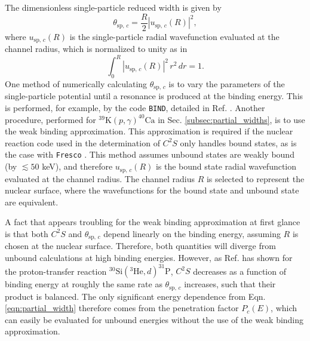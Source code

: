 The dimensionless single-particle reduced width is given by
\begin{equation} \label{eqn:single_particle_red_width}
\theta_{\mathrm{sp}, \, c} = \frac{R}{2} | u_{\mathrm{sp}, \, c}(R) |^{2},
\end{equation}
where $u_{\mathrm{sp}, \, c}(R)$ is the single-particle radial wavefunction evaluated at the channel radius, which is normalized to unity as in
\begin{equation}
\int_{0}^{R} |u_{\mathrm{sp}, \, c}(R)|^{2} \, r^{2} \, dr = 1.
\end{equation}
One method of numerically calculating $\theta_{\mathrm{sp}, \, c}$ is to vary the parameters of the single-particle potential until a resonance is produced at the binding energy. This is performed, for example, by the code \texttt{BIND}, detailed in Ref. \cite{Iliadis1997}. Another procedure, performed for $^{39}\mathrm{K}(p, \gamma)^{40}\mathrm{Ca}$ in Sec. \ref{subsec:partial_widths}, is to use the weak binding approximation. This approximation is required if the nuclear reaction code used in the determination of $C^{2}S$ only handles bound states, as is the case with \texttt{Fresco} \cite{Thompson1988,Fresco}. This method assumes unbound states are weakly bound (by $\lesssim 50$ keV), and therefore $u_{\mathrm{sp}, \, c}(R)$ is the bound state radial wavefunction evaluated at the channel radius. The channel radius $R$ is selected to represent the nuclear surface, where the wavefunctions for the bound state and unbound state are equivalent.

A fact that appears troubling for the weak binding approximation at first glance is that both $C^{2}S$ and $\theta_{\mathrm{sp}, \, c}$ depend linearly on the binding energy, assuming $R$ is chosen at the nuclear surface. Therefore, both quantities will diverge from unbound calculations at high binding energies. However, as Ref. \cite{Harrouz2023} has shown for the proton-transfer reaction $^{30}\mathrm{Si}(^{3}\mathrm{He},d)^{31}\mathrm{P}$, $C^{2}S$ decreases as a function of binding energy at roughly the same rate as $\theta_{\mathrm{sp}, \, c}$ increases, such that their product is balanced. The only significant energy dependence from Eqn. \ref{eqn:partial_width} therefore comes from the penetration factor $P_{c}(E)$, which can easily be evaluated for unbound energies without the use of the weak binding approximation.

